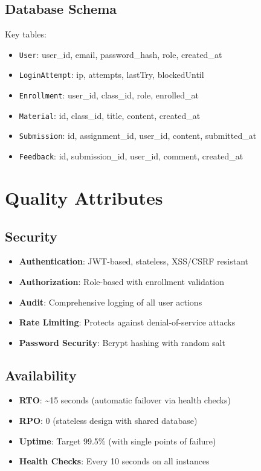 \documentclass[12pt,oneside,a4paper]{article}
\begin{document}
\subsection{Database Schema}
Key tables:
\begin{itemize}
    \item \texttt{User}: user\_id, email, password\_hash, role, created\_at
    \item \texttt{LoginAttempt}: ip, attempts, lastTry, blockedUntil
    \item \texttt{Enrollment}: user\_id, class\_id, role, enrolled\_at
    \item \texttt{Material}: id, class\_id, title, content, created\_at
    \item \texttt{Submission}: id, assignment\_id, user\_id, content, submitted\_at
    \item \texttt{Feedback}: id, submission\_id, user\_id, comment, created\_at
\end{itemize}

\newpage

\section{Quality Attributes}

\subsection{Security}
\begin{itemize}
    \item \textbf{Authentication}: JWT-based, stateless, XSS/CSRF resistant
    \item \textbf{Authorization}: Role-based with enrollment validation
    \item \textbf{Audit}: Comprehensive logging of all user actions
    \item \textbf{Rate Limiting}: Protects against denial-of-service attacks
    \item \textbf{Password Security}: Bcrypt hashing with random salt
\end{itemize}

\subsection{Availability}
\begin{itemize}
    \item \textbf{RTO}: \textasciitilde 15 seconds (automatic failover via health checks)
    \item \textbf{RPO}: 0 (stateless design with shared database)
    \item \textbf{Uptime}: Target 99.5\% (with single points of failure)
    \item \textbf{Health Checks}: Every 10 seconds on all instances
\end{itemize}
\end{document}
